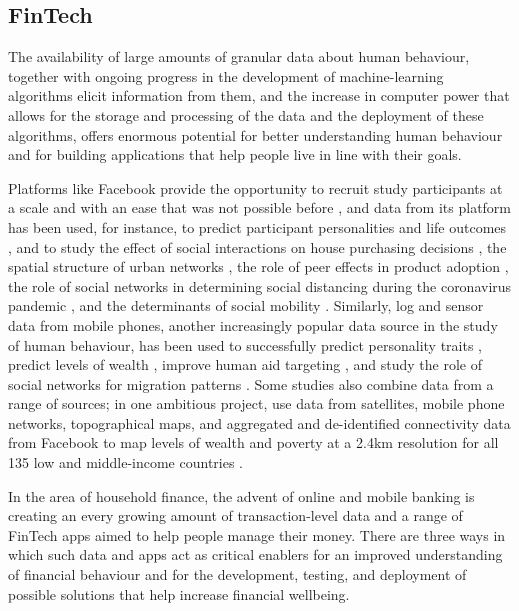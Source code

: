 \subsection{FinTech}%
\label{sub:large_scale_data_and_fintech}

The availability of large amounts of granular data about human behaviour,
together with ongoing progress in the development of machine-learning
algorithms elicit information from them, and the increase in computer power
that allows for the storage and processing of the data and the deployment of
these algorithms, offers enormous potential for better understanding human
behaviour \citep{jaffe2014big, buyalskaya2021golden} and for building
applications that help people live in line with their goals.

Platforms like Facebook provide the opportunity to recruit study participants
at a scale and with an ease that was not possible before
\citep{kosinski2015facebook}, and data from its platform has been used, for
instance, to predict participant personalities and life outcomes
\citep{youyou2015computer}, and to study the effect of social interactions on
house purchasing decisions \citep{bailey2018economic, bailey2019house}, the
spatial structure of urban networks \citep{bailey2020socialconnectedness}, the role of peer
effects in product adoption \citep{bailey2019peer}, the role of social networks
in determining social distancing during the coronavirus pandemic
\citep{bailey2020socialnetworks}, and the determinants of social mobility
\citep{chetty2022sociali, chetty2022socialii}. Similarly, log and sensor data
from mobile phones, another increasingly popular data source in the study of
human behaviour, has been used to successfully predict personality traits
\citep{montjoye2013predicting, stachl2020predicting}, predict levels of wealth
\citep{blumenstock2015predicting}, improve human aid targeting
\citep{aiken2022machine}, and study the role of social networks for migration
patterns \citep{blumenstock2019migration}. Some studies also combine data from
a range of sources; in one ambitious project, \citet{chi2022microestimates} use
data from satellites, mobile phone networks, topographical maps, and aggregated
and de-identified connectivity data from Facebook to map levels of wealth and
poverty at a 2.4km resolution for all 135 low and middle-income countries
\citep{chi2022microestimates}.

In the area of household finance, the advent of online and mobile banking is
creating an every growing amount of transaction-level data and a range of
FinTech apps aimed to help people manage their money. There are three ways in
which such data and apps act as critical enablers for an improved understanding
of financial behaviour and for the development, testing, and deployment of
possible solutions that help increase financial wellbeing.

